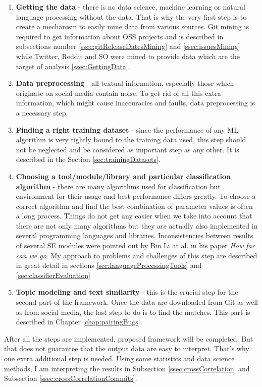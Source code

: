 \begin{enumerate}
\item{\textbf{Getting the data} - there is no data science, machine learning or natural language processing without the data. That is why the very first step is to create a mechanism to easily mine data from various sources. Git mining is required to get information about OSS projects and is described in subsections number \ref{ssec:gitReleaseDatesMining} and \ref{ssec:issuesMining} while Twitter, Reddit and SO were mined to provide data which are the target of analysis \ref{ssec:GettingData}.}
\item{\textbf{Data preprocessing} - all textual information, especially those which originate on social media contain noise. To get rid of all this extra information, which might cause inaccuracies and faults, data preprocessing is a necessary step.}
\item{\textbf{Finding a right training dataset} - since the performance of any ML algorithm is very tightly bound to the training data used, this step should not be neglected and be considered as important step as any other. It is described in the Section \ref{sec:trainingDatasets}.}
\item{\textbf{Choosing a tool/module/library and particular classification algorithm} - there are many algorithms used for classification but environment for their usage and best performance differs greatly. To choose a correct algorithm and find the best combination of parameter values is often a long process. Things do not get any easier when we take into account that there are not only many algorithms but they are actually also implemented in several programming languages and libraries. Inconsistencies between results of several SE modules were pointed out by Bin Li at al. in his paper \textit{How far can we go}. My approach to problems and challenges of this step are described in great detail in sections \ref{sec:languageProcessingTools} and \ref{sec:classifierEvaluation}}
\item{\textbf{Topic modeling and text similarity} - this is the crucial step for the second part of the framework. Once the data are downloaded from Git as well as from social media, the last step to do is to find the matches.   This part is described in Chapter \ref{chap:pairingBugs}.}
\end{enumerate}
After all the steps are implemented, proposed framework will be completed. But that does not guarantee that the output data are easy to interpret. That's why one extra additional step is needed. Using some statistics and data science methods, I am interpreting the results in Subsection \ref{ssec:crossCorrelation} and Subsection \ref{ssec:crossCorrelationCommits}.


